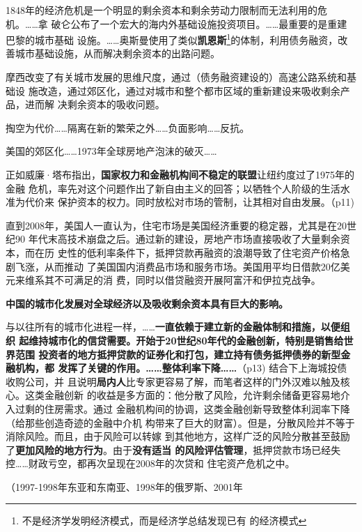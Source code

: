 1848年的经济危机是一个明显的剩余资本和剩余劳动力限制而无法利用的危机。……拿
破仑公布了一个宏大的海内外基础设施投资项目。……最重要的是重建巴黎的城市基础
设施。……奥斯曼使用了类似\textbf{凯恩斯}\footnote{不是经济学发明经济模式，而是经济学总结发现已有
  的经济模式}的体制，利用债务融资，改善城市基础设施，从而解决剩余资本的出路问题。

摩西改变了有关城市发展的思维尺度，通过（债务融资建设的）高速公路系统和基础设
施改造，通过郊区化，通过对城市和整个都市区域的重新建设来吸收剩余产品，进而解
决剩余资本的吸收问题。

掏空为代价……隔离在新的繁荣之外……负面影响……反抗。

美国的郊区化……1973年全球房地产泡沫的破灭……

正如威廉·塔布指出，\textbf{国家权力和金融机构间不稳定的联盟}让纽约度过了1975年的金融
危机，率先对这个问题作出了新自由主义的回答；以牺牲个人阶级的生活水准为代价来
保护资本的权力。同时放松对市场的管制，让其相对自由发展。（p11)




直到2008年，美国人一直认为，住宅市场是美国经济重要的稳定器，尤其是在20世纪90
年代末高技术崩盘之后。通过新的建设，房地产市场直接吸收了大量剩余资本，而在历
史性的低利率条件下，抵押贷款再融资的浪潮导致了住宅资产价格急剧飞涨，从而推动
了美国国内消费品市场和服务市场。美国用平均日借款20亿美元来维系其不可满足的消
费，同时以借贷融资开展阿富汗和伊拉克战争。

\textbf{中国的城市化发展对全球经济以及吸收剩余资本具有巨大的影响。}

与以往所有的城市化进程一样，……\textbf{一直依赖于建立新的金融体制和措施，以便组织
  起维持城市化的信贷需要。开始于20世纪80年代的金融创新，特别是销售给世界范围
  投资者的地方抵押贷款的证券化和打包，建立持有债务抵押债券的新型金融机构，都
  发挥了关键的作用。……整体利率下降……}（p13) 结合下上海城投债收购公司，并
且说明\textbf{局内人}比专家更容易了解，而笔者这样的门外汉难以触及核心。这类金融创新
的收益是多方面的：他分散了风险，允许剩余储备更容易地介入过剩的住房需求。通过
金融机构间的协调，这类金融创新导致整体利润率下降（给那些创造奇迹的金融中介机
构带来了巨大的财富）。但是，分散风险并不等于消除风险。而且，由于风险可以转嫁
到其他地方，这样广泛的风险分散甚至鼓励了\textbf{更加风险的地方行为}。由于\textbf{没有适当
的风险评估管理}，抵押贷款市场已经失控……财政亏空，都再次呈现在2008年的次贷和
住宅资产危机之中。

（1997-1998年东亚和东南亚、1998年的俄罗斯、2001年

